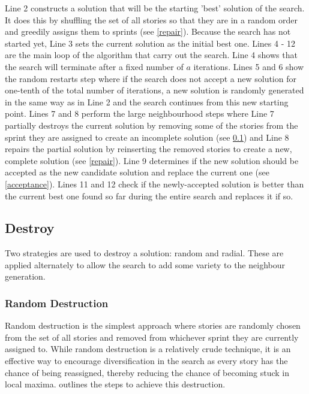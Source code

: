 Line 2 constructs a solution that will be the starting 'best' solution of the search. It does this by shuffling the set of all stories so that they are in a random order and greedily assigns them to sprints (see \cref{repair}). Because the search has not started yet, Line 3 sets the current solution as the initial best one. Lines 4 - 12 are the main loop of the algorithm that carry out the search. Line 4 shows that the search will terminate after a fixed number of $a$ iterations. Lines 5 and 6 show the random restarts step where if the search does not accept a new solution for one-tenth of the total number of iterations, a new solution is randomly generated in the same way as in Line 2 and the search continues from this new starting point. Lines 7 and 8 perform the large neighbourhood steps where Line 7 partially destroys the current solution by removing some of the stories from the sprint they are assigned to create an incomplete solution (see \cref{destroy}) and Line 8 repairs the partial solution by reinserting the removed stories to create a new, complete solution (see \cref{repair}). Line 9 determines if the new solution should be accepted as the new candidate solution and replace the current one (see \cref{acceptance}). Lines 11 and 12 check if the newly-accepted solution is better than the current best one found so far during the entire search and replaces it if so.

\subsection{Destroy} \label{destroy}

Two strategies are used to destroy a solution: random and radial. These are applied alternately to allow the search to add some variety to the neighbour generation.

\subsubsection{Random Destruction}

Random destruction is the simplest approach where stories are randomly chosen from the set of all stories and removed from whichever sprint they are currently assigned to. While random destruction is a relatively crude technique, it is an effective way to encourage diversification in the search as every story has the chance of being reassigned, thereby reducing the chance of becoming stuck in local maxima.  outlines the steps to achieve this destruction.

